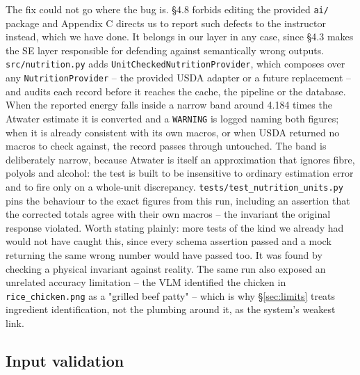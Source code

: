 \documentclass[11pt,a4paper]{article}
\begin{document}
\noindent The fix could not go where the bug is. \S4.8 forbids editing the provided \texttt{ai/} package and Appendix C directs us to report such defects to the instructor instead, which we have done. It belongs in our layer in any case, since \S4.3 makes the SE layer responsible for defending against semantically wrong outputs. \texttt{src/nutrition.py} adds \texttt{UnitCheckedNutritionProvider}, which composes over any \texttt{NutritionProvider} -- the provided USDA adapter or a future replacement -- and audits each record before it reaches the cache, the pipeline or the database. When the reported energy falls inside a narrow band around 4.184 times the Atwater estimate it is converted and a \texttt{WARNING} is logged naming both figures; when it is already consistent with its own macros, or when USDA returned no macros to check against, the record passes through untouched. The band is deliberately narrow, because Atwater is itself an approximation that ignores fibre, polyols and alcohol: the test is built to be insensitive to ordinary estimation error and to fire only on a whole-unit discrepancy. \texttt{tests/test\_nutrition\_units.py} pins the behaviour to the exact figures from this run, including an assertion that the corrected totals agree with their own macros -- the invariant the original response violated. Worth stating plainly: more tests of the kind we already had would not have caught this, since every schema assertion passed and a mock returning the same wrong number would have passed too. It was found by checking a physical invariant against reality. The same run also exposed an unrelated accuracy limitation -- the VLM identified the chicken in \texttt{rice\_chicken.png} as a "grilled beef patty" -- which is why \S\ref{sec:limits} treats ingredient identification, not the plumbing around it, as the system's weakest link.

\subsection{Input validation}
\end{document}
